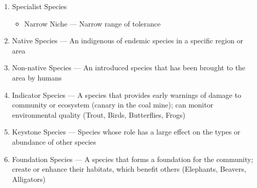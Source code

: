 \documentclass[12pt]{article}
\begin{document}
\begin{enumerate}
  \item Specialist Species

    \begin{itemize}

      \item Narrow Niche — Narrow range of tolerance

    \end{itemize}

  \item Native Species — An indigenous of endemic species in a specific region or area

  \item Non-native Species — An introduced species that has been brought to the area by humans

  \item Indicator Species — A species that provides early warnings of damage to community or ecosystem (canary in the coal mine); can monitor environmental quality (Trout, Birds, Butterflies, Frogs)

  \item Keystone Species — Species whose role has a large effect on the types or abundance of other species

  \item Foundation Species — A species that forms a foundation for the community; create or enhance their habitats, which benefit others (Elephants, Beavers, Alligators)

\end{enumerate}
\end{document}
